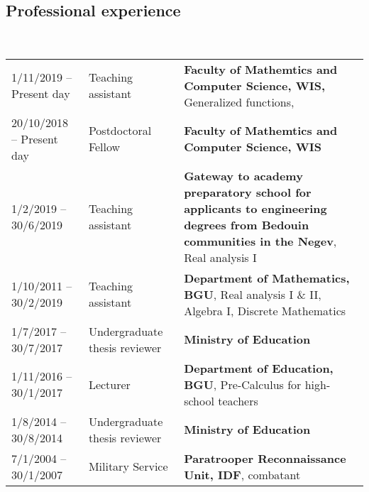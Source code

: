 \documentclass[leqno,11pt,a4paper]{amsart}
\numberwithin{equation}{section}
\numberwithin{figure}{section}
\theoremstyle{plain}
\theoremstyle{definition}
\theoremstyle{remark}
\begin{document}
\subsection*{\sc Professional experience}~
\begin{longtable}{p{} p{} p{}}

 1/11/2019 -- Present day& Teaching assistant& \textbf{Faculty of Mathemtics and Computer Science, WIS,} Generalized functions,
\\
20/10/2018 -- Present day& Postdoctoral Fellow&\textbf{Faculty of Mathemtics and Computer Science, WIS}\\
1/2/2019 -- 30/6/2019& Teaching assistant&
\textbf{Gateway to academy preparatory school for applicants to engineering degrees from Bedouin communities in the Negev}, Real analysis I\\
1/10/2011 -- 30/2/2019 & Teaching assistant& \textbf{Department of Mathematics, BGU}, Real analysis I \& II, Algebra I, Discrete Mathematics
\\
1/7/2017 -- 30/7/2017& Undergraduate thesis reviewer&\textbf{Ministry of Education}\\
1/11/2016 -- 30/1/2017& Lecturer &\textbf{
Department of Education, BGU}, Pre-Calculus for high-school teachers
\\
1/8/2014 -- 30/8/2014& Undergraduate thesis reviewer&\textbf{Ministry of Education}\\
7/1/2004 -- 30/1/2007& Military Service& \textbf{Paratrooper Reconnaissance Unit, IDF}, combatant \\
\end{longtable}
~\\
\end{document}
